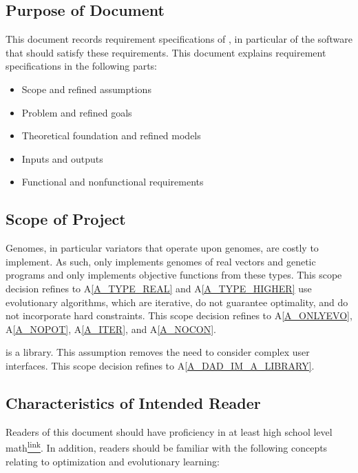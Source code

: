 \documentclass[12pt]{article}
\newcommand{\aref}[1]{A\ref{#1}}
\begin{document}
\subsection{Purpose of Document}
\label{subsec:purpose}

This document records requirement specifications of \progname{}, in particular of the software that should satisfy these requirements. This document explains requirement specifications in the following parts:

\begin{itemize}
  \item Scope and refined assumptions
  \item Problem and refined goals
  \item Theoretical foundation and refined models
  \item Inputs and outputs
  \item Functional and nonfunctional requirements
\end{itemize}

\subsection{Scope of Project} 
\label{subsec:scopep}
Genomes, in particular variators that operate upon genomes, are costly to implement. As such, \thisproject{} only implements genomes of real vectors and genetic programs and only implements objective functions from these types. This scope decision refines to \aref{A_TYPE_REAL} and \aref{A_TYPE_HIGHER}
\thisproject{} use evolutionary algorithms, which are iterative, do not guarantee optimality, and do not incorporate hard constraints. This scope decision refines to \aref{A_ONLYEVO}, \aref{A_NOPOT}, \aref{A_ITER}, and \aref{A_NOCON}.

\thisproject{} is a library. This assumption removes the need to consider complex user interfaces. This scope decision refines to \aref{A_DAD_IM_A_LIBRARY}.

\subsection{Characteristics of Intended Reader} \label
{sec_IntendedReader}
\label{subsec:reader}

Readers of this document should have proficiency in at least high school level math\href{https://www.edu.gov.on.ca/eng/curriculum/secondary/math1112currb.pdf}{\textsuperscript{link}}. In addition, readers should be familiar with the following concepts relating to optimization and evolutionary learning:
\end{document}
